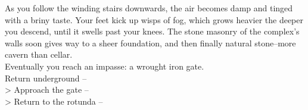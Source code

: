 As you follow the winding stairs downwards, the air becomes damp and tinged with a briny taste. Your feet kick up wisps of fog, which grows heavier the deeper you descend, until it swells past your knees. The stone masonry of the complex's walls soon gives way to a sheer foundation, and then finally natural stone--more cavern than cellar.\\

Eventually you reach an impasse: a wrought iron gate.\\

 Return underground -- \\
> Approach the gate -- \\
> Return to the rotunda -- 